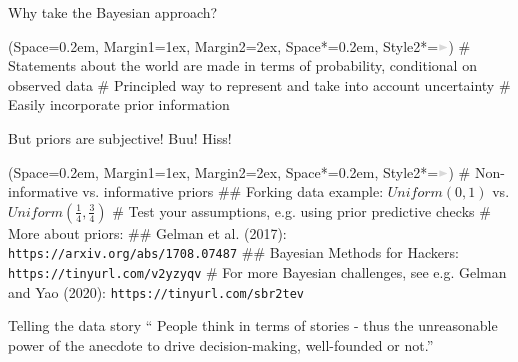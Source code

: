 \documentclass[12pt, aspectratio=149]{beamer}
\newcommand{\listSpace}{0.2em}
\theoremstyle{plain}
\begin{document}
\begin{frame}[fragile]{Why take the Bayesian approach?}
	\begin{easylist}
		\ListProperties(Space=\listSpace, Margin1=1ex, Margin2=2ex, Space*=\listSpace, Style2*=$\color{bggraydark}\blacktriangleright$\space)
		# Statements about the world are made in terms of probability, conditional on observed data
        # Principled way to represent and take into account uncertainty
		# Easily incorporate prior information
	\end{easylist}
\end{frame}

\begin{frame}[fragile]{But priors are subjective! Buu! Hiss!}
	\begin{easylist}
		\ListProperties(Space=\listSpace, Margin1=1ex, Margin2=2ex, Space*=\listSpace, Style2*=$\color{bggraydark}\blacktriangleright$\space)
		# Non-informative vs. informative priors
		## Forking data example: $Uniform(0, 1)$ vs. $Uniform(\frac{1}{4}, \frac{3}{4})$
		# Test your assumptions, e.g. using prior predictive checks
		# More about priors:
		## Gelman et al. (2017): \footnotesize\texttt{https://arxiv.org/abs/1708.07487}
		## Bayesian Methods for Hackers: \footnotesize\texttt{https://tinyurl.com/v2yzyqv}	
		# For more Bayesian challenges, see e.g. Gelman and Yao (2020): \footnotesize\texttt{https://tinyurl.com/sbr2tev}
	\end{easylist}
\end{frame}

\begin{frame}[fragile]{Telling the data story}
	`` People think in terms of stories - thus the unreasonable power of the anecdote to drive decision-making, well-founded or not.''
\end{frame}
\end{document}

